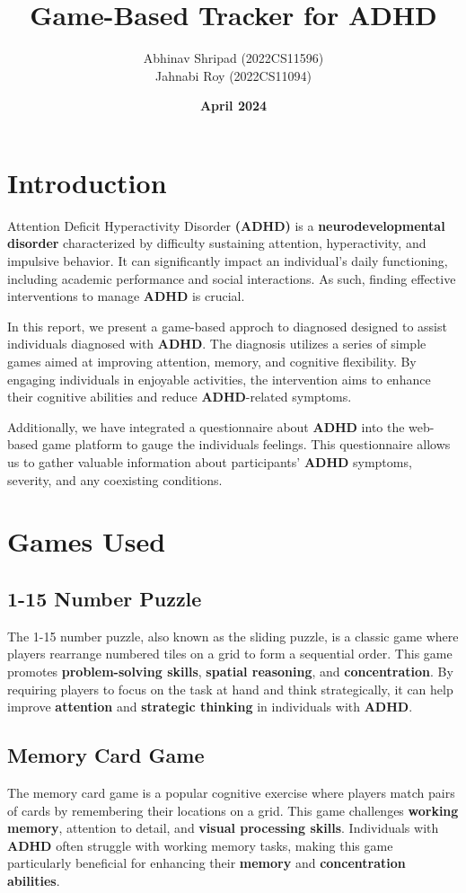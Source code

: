 \documentclass{article}
\title{\textbf{Game-Based Tracker for ADHD}}
\author{Abhinav Shripad (2022CS11596) \\ Jahnabi Roy (2022CS11094)}
\date{\textbf{April 2024}}
\begin{document}
\maketitle

\section{Introduction}
Attention Deficit Hyperactivity Disorder \textbf{(ADHD)} is a \textbf{neurodevelopmental disorder} characterized by difficulty sustaining attention,
hyperactivity, and impulsive behavior. It can significantly impact an individual's daily functioning,
including academic performance and social interactions. As such, finding effective interventions to manage \textbf{ADHD} is crucial.

In this report, we present a game-based approch to diagnosed designed to assist individuals diagnosed with \textbf{ADHD}. 
The diagnosis utilizes a series of simple games aimed at improving attention, memory, and cognitive flexibility. 
By engaging individuals in enjoyable activities, the intervention aims to enhance their cognitive abilities and reduce \textbf{ADHD}-related symptoms.

Additionally, we have integrated a questionnaire about \textbf{ADHD} into the web-based game platform to gauge the individuals feelings. 
This questionnaire allows us to gather valuable information about participants' \textbf{ADHD} symptoms, severity, and any coexisting conditions.

\section{Games Used}
\subsection{1-15 Number Puzzle}
The 1-15 number puzzle, also known as the sliding puzzle, is a classic game where players rearrange numbered tiles on a grid to form a sequential order. 
This game promotes \textbf{problem-solving skills}, \textbf{spatial reasoning}, and \textbf{concentration}. By requiring players to focus on the task at hand and think strategically, it can help improve \textbf{attention} and \textbf{strategic thinking} in individuals with \textbf{ADHD}.

\subsection{Memory Card Game}
The memory card game is a popular cognitive exercise where players match pairs of cards by remembering their locations on a grid. 
This game challenges \textbf{working memory}, attention to detail, and \textbf{visual processing skills}. 
Individuals with \textbf{ADHD} often struggle with working memory tasks, making this game particularly beneficial for enhancing their \textbf{memory} and \textbf{concentration abilities}.
\end{document}
